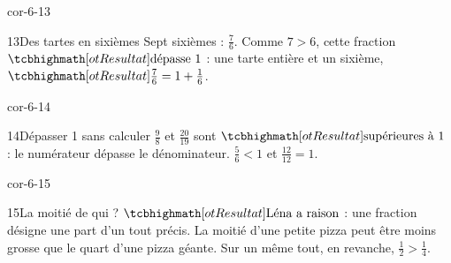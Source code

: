 \begin{blocLivre}{cor-6-13}\begin{corrige}{13}{Des tartes en sixièmes}
Sept sixièmes : $\frac76$. Comme $7>6$, cette fraction $\res{\text{dépasse }1}$ : une tarte entière et un sixième, $\res{\frac76=1+\frac16}$.
\end{corrige}\end{blocLivre}
\begin{blocLivre}{cor-6-14}\begin{corrige}{14}{Dépasser 1 sans calculer}
$\frac98$ et $\frac{20}{19}$ sont $\res{\text{supérieures à }1}$ : le numérateur dépasse le dénominateur. $\frac56<1$ et $\frac{12}{12}=1$.
\end{corrige}\end{blocLivre}
\begin{blocLivre}{cor-6-15}\begin{corrige}{15}{La moitié de qui ?}
$\res{\text{Léna a raison}}$ : une fraction désigne une part d’un tout précis. La moitié d’une petite pizza peut être moins grosse que le quart d’une pizza géante. Sur un même tout, en revanche, $\frac12>\frac14$.
\end{corrige}\end{blocLivre}
